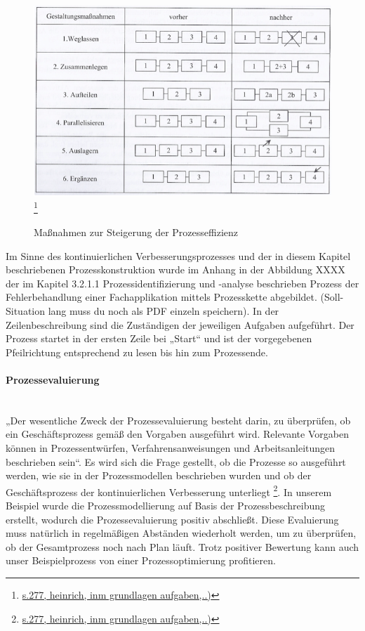 \begin{figure}[h!]
	\centering
	\includegraphics[width=15cm]{kapitel/gruppe1_2/bilder/prozesseffizienz}
	\footnote{\url{s.277, heinrich, inm grundlagen aufgaben,..)}}
	\caption{Maßnahmen zur Steigerung der Prozesseffizienz}
	\label{fig_massnahmen_prozesseffizienz}
\end{figure}


Im Sinne des kontinuierlichen Verbesserungsprozesses und der in diesem Kapitel beschriebenen Prozesskonstruktion wurde im Anhang in der Abbildung XXXX der im Kapitel 3.2.1.1 Prozessidentifizierung und -analyse beschrieben Prozess der Fehlerbehandlung einer Fachapplikation mittels Prozesskette abgebildet. (Soll-Situation lang muss du noch als PDF einzeln speichern). In der Zeilenbeschreibung sind die Zuständigen der jeweiligen Aufgaben aufgeführt. Der Prozess startet in der ersten Zeile bei „Start“ und ist der vorgegebenen Pfeilrichtung entsprechend zu lesen bis hin zum Prozessende.

\paragraph{Prozessevaluierung}\mbox{}\\
„Der wesentliche Zweck der Prozessevaluierung besteht darin, zu überprüfen, ob ein Geschäftsprozess gemäß den Vorgaben ausgeführt wird. Relevante Vorgaben können in Prozessentwürfen, Verfahrensanweisungen und Arbeitsanleitungen  beschrieben sein“. Es wird sich die Frage gestellt, ob die Prozesse so ausgeführt werden, wie sie in der Prozessmodellen beschrieben wurden und ob der Geschäftsprozess der kontinuierlichen Verbesserung unterliegt \footnote{\url{s.277, heinrich, inm grundlagen aufgaben,..)}}. In unserem Beispiel wurde die Prozessmodellierung auf Basis der Prozessbeschreibung erstellt, wodurch die Prozessevaluierung positiv abschließt. Diese Evaluierung muss natürlich in regelmäßigen Abständen wiederholt werden, um zu überprüfen, ob der Gesamtprozess noch nach Plan läuft. Trotz positiver Bewertung kann auch unser Beispielprozess von einer Prozessoptimierung profitieren.

